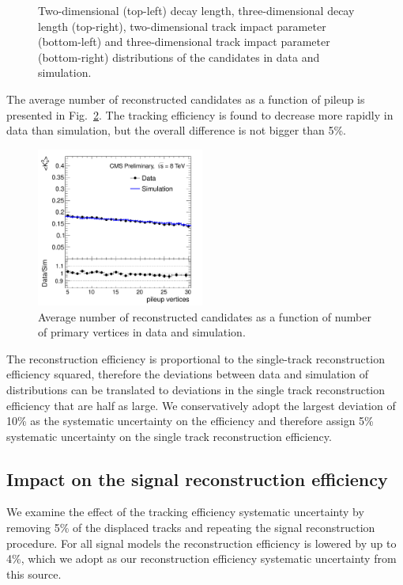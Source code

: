\begin{figure}[htbp]
\caption{Two-dimensional (top-left) decay length, three-dimensional decay length (top-right), two-dimensional track impact parameter (bottom-left) and three-dimensional track impact parameter (bottom-right) distributions 
of the \Kshort candidates in data and simulation. \label{fig:ksdisplacement}}
\end{figure}

The average number of 
reconstructed \Kshort candidates as a function of pileup is presented in Fig.~\ref{fig:kspileup}.
The tracking efficiency is found to decrease more rapidly in data than simulation, but the
overall difference is not bigger than 5\%.

\begin{figure}[htbp]
\centering
\includegraphics[width=0.49\textwidth]{plots/kshort/effnPV.pdf}
\caption{Average number of reconstructed \Kshort candidates as a function of number of primary vertices in data and simulation. \label{fig:kspileup}}
\end{figure}

The \Kshort reconstruction efficiency is proportional to the single-track reconstruction efficiency squared, 
therefore the deviations between data and simulation of \Kshort distributions can be translated to deviations in the single track reconstruction efficiency that are half as large. We conservatively adopt the largest deviation 
of 10\% as the systematic uncertainty on the \Kshort efficiency and therefore assign 5\% systematic uncertainty on the 
single track reconstruction efficiency. 

\subsection{Impact on the signal reconstruction efficiency}

We examine the effect of the tracking efficiency systematic uncertainty by removing 5\% of the displaced tracks 
 and repeating the signal reconstruction procedure.
For all signal models the reconstruction efficiency is lowered by up to 4\%, which we adopt as our reconstruction
efficiency systematic uncertainty from this source.  

